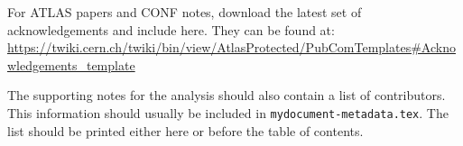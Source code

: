 \documentclass[UKenglish]{latex/atlasdoc}
\begin{document}
For ATLAS papers and CONF notes, download the latest set of acknowledgements and include here.
They can be found at:\\
\url{https://twiki.cern.ch/twiki/bin/view/AtlasProtected/PubComTemplates#Acknowledgements_template}

The supporting notes for the analysis should also contain a list of contributors.
This information should usually be included in \texttt{mydocument-metadata.tex}.
The list should be printed either here or before the table of contents.




\printbibliography
%
%
\end{document}
